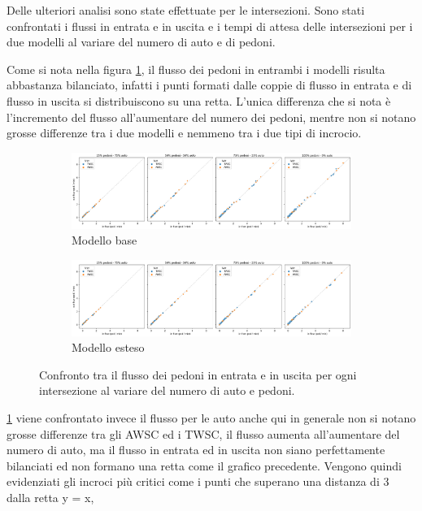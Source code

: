 Delle ulteriori analisi sono state effettuate per le intersezioni. Sono stati confrontati i 
flussi in entrata e in uscita e i tempi di attesa delle intersezioni per i due modelli 
al variare del numero di auto e di pedoni.

%
Come si nota nella figura \ref{fig:analisi-comparison-in-out-flow-ped}, il flusso dei pedoni
in entrambi i modelli risulta abbastanza bilanciato,
infatti i punti formati dalle coppie di flusso in entrata e di flusso in uscita si distribuiscono su una retta.
L'unica differenza che si nota è l'incremento del flusso all'aumentare del numero dei pedoni,
mentre non si notano grosse differenze tra i due modelli e nemmeno tra i due tipi di incrocio.

\begin{figure}[ht]
    \centering
    \begin{subfigure}{0.9\textwidth}
        \centering
        \includegraphics[width=\textwidth]{images/analisi/comparison-base-in-out-flow-ped.png}
        \caption{Modello base}
    \end{subfigure}
    \hfill
    \begin{subfigure}{0.9\textwidth}
        \centering
        \includegraphics[width=\textwidth]{images/analisi/comparison-new-in-out-flow-ped.png}
        \caption{Modello esteso}
    \end{subfigure}
    \caption{
        Confronto tra il flusso dei pedoni in entrata e in uscita per ogni intersezione al variare del numero di auto e pedoni.
    }
    \label{fig:analisi-comparison-in-out-flow-ped}
\end{figure}

\ref{fig:analisi-comparison-in-out-flow-ped} viene confrontato invece il flusso per le auto anche
qui in generale non si notano grosse differenze tra gli AWSC ed i TWSC, il flusso aumenta all'aumentare del numero di auto,
ma il flusso in entrata ed in uscita non siano perfettamente bilanciati ed non
formano una retta come il grafico precedente.
Vengono quindi evidenziati gli incroci più critici come i punti che superano una distanza di 3 dalla retta y = x,
\pagebreak

